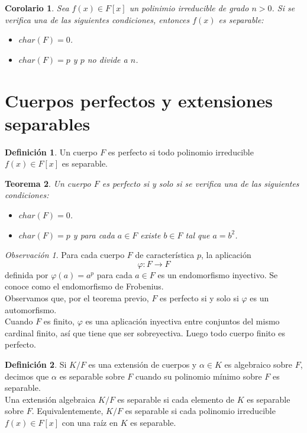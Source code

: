 \documentclass{report}
\newtheorem{theorem}{Teorema}[chapter]
\newtheorem{corollary}[theorem]{Corolario}
\theoremstyle{remark}
\newtheorem*{remark}{Observación}
\theoremstyle{definition}
\newtheorem{definition}{Definición}[chapter]
\theoremstyle{definition}
\theoremstyle{definition}
\begin{document}
\begin{corollary}
    Sea $f(x) \in F[x]$ un polinimio irreducible de grado $n > 0$. Si se verifica una de las siguientes condiciones, entonces $f(x)$ es separable:
    \begin{itemize}
        \item $char(F) = 0$.
        \item $char(F) = p$ y $p$ no divide a $n$.
    \end{itemize}
\end{corollary}

\section{Cuerpos perfectos y extensiones separables}

\begin{definition}
    Un cuerpo $F$ es perfecto si todo polinomio irreducible $f(x) \in F[x]$ es separable.
\end{definition}

\begin{theorem}
    Un cuerpo $F$ es perfecto si y solo si se verifica una de las siguientes condiciones:
    \begin{itemize}
        \item $char(F) = 0$.
        \item $char(F) = p$ y para cada $a \in F$ existe $b \in F$ tal que $a = b^2$.
    \end{itemize}
\end{theorem}

\begin{remark}
    Para cada cuerpo $F$ de característica $p$, la aplicación
    $$\varphi : F \to F$$
    definida por $\varphi(a) = a^p$ para cada $a \in F$ es un endomorfismo inyectivo.
    Se conoce como el endomorfismo de Frobenius.\\
    Observamos que, por el teorema previo, $F$ es perfecto si y solo si $\varphi$ es un automorfismo.\\
    Cuando $F$ es finito, $\varphi$ es una aplicación inyectiva entre conjuntos del mismo cardinal finito, así que tiene que ser sobreyectiva.
    Luego todo cuerpo finito es perfecto.
\end{remark}

\begin{definition}
    Si $K/F$ es una extensión de cuerpos y $\alpha \in K$ es algebraico sobre $F$, decimos que $\alpha$ es separable sobre $F$ cuando su polinomio mínimo sobre $F$ es separable.\\
    Una extensión algebraica $K/F$ es separable si cada elemento de $K$ es separable sobre $F$.
    Equivalentemente, $K/F$ es separable si cada polinomio irreducible $f(x) \in F[x]$ con una raíz en $K$ es separable.
\end{definition}
\end{document}

